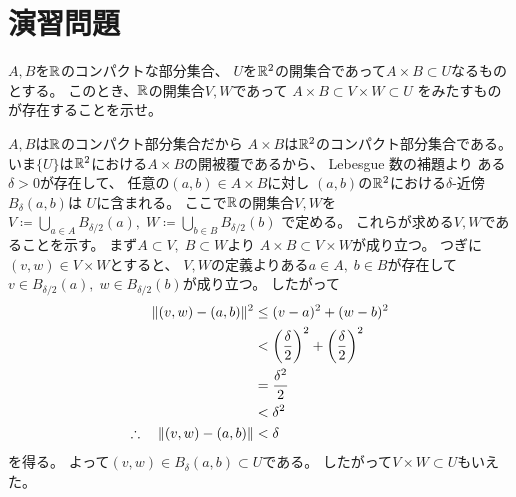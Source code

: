\documentclass[report]{jlreq}
\begin{document}
%
\section{演習問題}

\begin{problem}[東大数理 2007A]
    $A, B$を$\mathbb{R}$のコンパクトな部分集合、
    $U$を$\mathbb{R}^2$の開集合であって$A \times B \subset U$なるものとする。
    このとき、$\mathbb{R}$の開集合$V, W$であって
    $A \times B \subset V \times W \subset U$
    をみたすものが存在することを示せ。
\end{problem}

\begin{answer}
    $A, B$は$\mathbb{R}$のコンパクト部分集合だから
    $A \times B$は$\mathbb{R}^2$のコンパクト部分集合である。
    いま$\{ U \}$は$\mathbb{R}^2$における$A \times B$の開被覆であるから、
    Lebesgue 数の補題より
    ある$\delta > 0$が存在して、
    任意の$(a, b) \in A \times B$に対し
    $(a, b)$の$\mathbb{R}^2$における$\delta$-近傍$B_\delta (a, b)$は
    $U$に含まれる。
    ここで$\mathbb{R}$の開集合$V, W$を
    $V \coloneqq \bigcup_{a \in A} B_{\delta / 2}(a), \;
        W \coloneqq \bigcup_{b \in B} B_{\delta / 2}(b)$
    で定める。
    これらが求める$V, W$であることを示す。
    まず$A \subset V, \; B \subset W$より
    $A \times B \subset V \times W$が成り立つ。
    つぎに$(v, w) \in V \times W$とすると、
    $V, W$の定義よりある$a \in A, \; b \in B$が存在して
    $v \in B_{\delta / 2}(a), \; w \in B_{\delta / 2}(b)$が成り立つ。
    したがって
    \begin{alignat}{1}
        \| (v, w) - (a, b) \|^2
            &\le (v - a)^2 + (w - b)^2 \\
            &< \left({\frac{\delta}{2}}\right)^2 + \left({\frac{\delta}{2}}\right)^2 \\
            &= \frac{\delta^2}{2} \\
            &< \delta^2 \\
        \therefore \quad \| (v, w) - (a, b) \|
            &< \delta
    \end{alignat}
    を得る。
    よって$(v, w) \in B_\delta (a, b) \subset U$である。
    したがって$V \times W \subset U$もいえた。
\end{answer}
\end{document}
